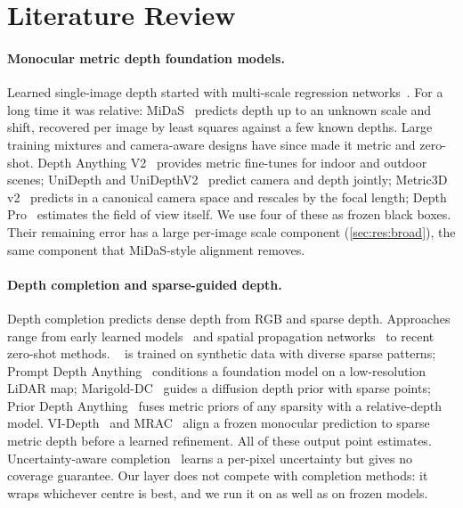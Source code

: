 \section{Literature Review}
\label{sec:literature}

\paragraph{Monocular metric depth foundation models.}
Learned single-image depth started with multi-scale regression networks~\cite{eigen2014depth}.
For a long time it was relative: MiDaS~\cite{ranftl2022midas} predicts depth up to an unknown scale and shift, recovered per image by least squares against a few known depths.
Large training mixtures and camera-aware designs have since made it metric and zero-shot.
Depth Anything V2~\cite{yang2024dav2} provides metric fine-tunes for indoor and outdoor scenes; UniDepth and UniDepthV2~\cite{piccinelli2024unidepth,piccinelli2025unidepthv2} predict camera and depth jointly; Metric3D v2~\cite{hu2024metric3dv2} predicts in a canonical camera space and rescales by the focal length; Depth Pro~\cite{bochkovskii2025depthpro} estimates the field of view itself.
We use four of these as frozen black boxes.
Their remaining error has a large per-image scale component (\cref{sec:res:broad}), the same component that MiDaS-style alignment removes.

\paragraph{Depth completion and sparse-guided depth.}
Depth completion predicts dense depth from RGB and sparse depth.
Approaches range from early learned models~\cite{ma2018sparse,uhrig2017sparsity} and spatial propagation networks~\cite{cheng2018cspn,park2020nlspn} to recent zero-shot methods.
\omnidc~\cite{zuo2025omnidc} is trained on synthetic data with diverse sparse patterns; Prompt Depth Anything~\cite{lin2025promptda} conditions a foundation model on a low-resolution LiDAR map; Marigold-DC~\cite{viola2025marigolddc} guides a diffusion depth prior with sparse points; Prior Depth Anything~\cite{wang2025priorda} fuses metric priors of any sparsity with a relative-depth model.
VI-Depth~\cite{wofk2023videpth} and MRAC~\cite{roy2026mrac} align a frozen monocular prediction to sparse metric depth before a learned refinement. All of these output point estimates.
Uncertainty-aware completion~\cite{eldesokey2020uncertainty,qu2021bdbf} learns a per-pixel uncertainty but gives no coverage guarantee.
Our layer does not compete with completion methods: it wraps whichever centre is best, and we run it on \omnidc as well as on frozen models.

